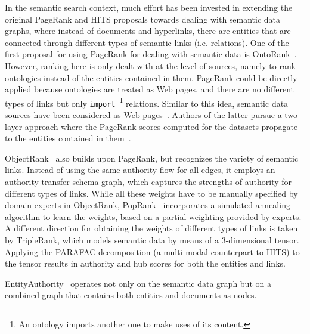 In the semantic search context, much effort has been invested in extending the original PageRank and HITS proposals towards dealing with semantic data graphs, where instead of documents and hyperlinks, there are entities that are connected through different types of semantic links (i.e. relations). One of the first proposal for using PageRank for dealing with semantic data is OntoRank~\cite{DBLP:conf/semweb/DingPFJPK05}. However, ranking here is only dealt with at the level of sources, namely to rank ontologies instead of the entities contained in them. PageRank could be directly applied because ontologies are treated as Web pages, and there are no different types of links but only \verb+import+~\footnote{An ontology imports another one to make uses of its content.} relations. Similar to this idea, semantic data sources have been considered as Web pages~\cite{DBLP:conf/esws/DelbruTCTD10,DBLP:conf/semweb/HarthKD09}. Authors of the latter pursue a two-layer approach where the PageRank scores computed for the datasets propagate to the entities contained in them~\cite{DBLP:conf/semweb/HarthKD09}. 

ObjectRank~\cite{DBLP:conf/vldb/BalminHP04} also builds upon PageRank, but recognizes the variety of semantic links. Instead of using the same authority flow for all edges, it employs an authority transfer schema graph, which captures the strengths of authority for different types of links. While all these weights have to be manually specified by domain experts in ObjectRank, PopRank~\cite{DBLP:conf/www/NieZWM05} incorporates a simulated annealing algorithm to learn the weights, based on a partial weighting provided by experts. A different direction for obtaining the weights of different types of links is taken by TripleRank, which models semantic data by means of a 3-dimensional tensor. Applying the PARAFAC decomposition (a multi-modal counterpart to HITS) to the tensor results in authority and hub scores for both the entities and links. 

EntityAuthority~\cite{DBLP:conf/webdb/StoyanovichBBW07} operates not only on the semantic data graph but on a combined graph that contains both entities and documents as nodes. 

